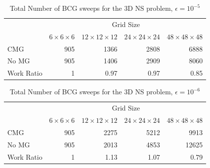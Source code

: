 \begin{table}[hbtp]

    \begin{centering}

        \caption{Total Number of BCG sweeps for the 3D NS problem, $\epsilon=10^{-5}$}
        \label{table_3D_1}
        \vspace{1ex}

        \begin{tabular}{|l|rrrr|} \hline

                     & \multicolumn{4}{c|}{Grid Size}                  \\
            
                     & $6\times  6\times  6$  & $12\times 12 \times 12$ 
                     & $24\times 24\times 24$ & $48\times 48 \times 48$ \\ \hline
        CMG          & 905      & 1366       & 2808       &  6888      \\ 
        No MG        & 905      & 1406       & 2909       &  8060      \\ \hline
        Work Ratio   & 1        & 0.97       & 0.97       &  0.85      \\ \hline
        
        \end{tabular}

    \end{centering}

\end{table}
\begin{table}[hbtp]

    \begin{centering}

        \caption{Total Number of BCG sweeps for the 3D NS problem, $\epsilon=10^{-6}$}
        \label{table_3D_2}
        \vspace{1ex}

        \begin{tabular}{|l|rrrr|} \hline

                     & \multicolumn{4}{c|}{Grid Size}                  \\
            
                     & $6\times  6\times  6$  & $12\times 12\times 12$ 
                     & $24\times 24\times 24$ & $48\times 48\times 48$ \\ \hline
         CMG         & 905      &  2275      &  5212      & 9913       \\
         No MG       & 905      &  2013      &  4853      & 12625      \\ \hline
         Work Ratio  & 1        &  1.13      &  1.07      & 0.79       \\ \hline
        
        \end{tabular}

    \end{centering}

\end{table}



